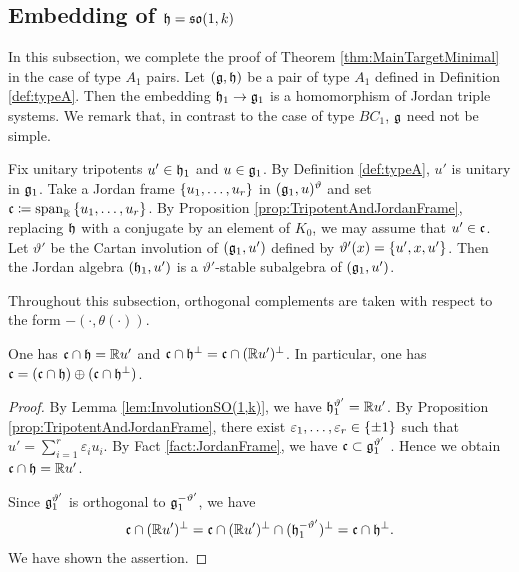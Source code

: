 \subsection{Embedding of \texorpdfstring{$\mathfrak{h} = \mathfrak{so}(1, k)$}{h=so(1,k)}}

In this subsection, we complete the proof of Theorem \ref{thm:MainTargetMinimal} in the case of type $A_1$ pairs.
Let $(\mathfrak{g}, \mathfrak{h})$ be a pair of type $A_1$ defined in Definition \ref{def:typeA}.
Then the embedding $\mathfrak{h}_1 \rightarrow \mathfrak{g}_1$ is a homomorphism of Jordan triple systems.
We remark that, in contrast to the case of type $BC_1$, $\mathfrak{g}$ need not be simple.

Fix unitary tripotents $u' \in \mathfrak{h}_1$ and $u \in \mathfrak{g}_1$.
By Definition \ref{def:typeA}, $u'$ is unitary in $\mathfrak{g}_1$.
Take a Jordan frame $\left\{u_1, \ldots, u_r \right\}$ in $(\mathfrak{g}_1, u)^\vartheta$ and set $\mathfrak{c}\coloneq \mathrm{span}_{\mathbb{R}}\left\{u_1, \ldots, u_r\right\}$.
By Proposition \ref{prop:TripotentAndJordanFrame}, replacing $\mathfrak{h}$ with a conjugate by an element of $K_0$, we may assume that $u' \in \mathfrak{c}$.
Let $\vartheta'$ be the Cartan involution of $(\mathfrak{g}_1, u')$ defined by $\vartheta'(x) = \{u', x, u'\}$.
Then the Jordan algebra $(\mathfrak{h}_1, u')$ is a $\vartheta'$-stable subalgebra of $(\mathfrak{g}_1, u')$.

Throughout this subsection, orthogonal complements are taken with respect to the form $-(\cdot,\theta(\cdot))$.

\begin{lemma} \label{lem:HperpInC}
	One has $\mathfrak{c}\cap \mathfrak{h} = \mathbb{R} u'$ and $\mathfrak{c} \cap \mathfrak{h}^\perp = \mathfrak{c} \cap (\mathbb{R} u')^\perp$.
	In particular, one has $\mathfrak{c} = (\mathfrak{c}\cap \mathfrak{h}) \oplus (\mathfrak{c} \cap \mathfrak{h}^\perp)$.
\end{lemma}

\begin{proof}
	By Lemma \ref{lem:InvolutionSO(1,k)}, we have $\mathfrak{h}_1^{\vartheta'} = \mathbb{R} u'$.
	By Proposition \ref{prop:TripotentAndJordanFrame}, there exist $\varepsilon_1, \ldots, \varepsilon_r \in \left\{\pm 1 \right\}$ such that $u' = \sum_{i=1}^r \varepsilon_i u_i$.
	By Fact \ref{fact:JordanFrame}, we have $\mathfrak{c} \subset \mathfrak{g}_1^{\vartheta'}$ .
	Hence we obtain $\mathfrak{c}\cap \mathfrak{h} = \mathbb{R} u'$.

	Since $\mathfrak{g}_1^{\vartheta'}$ is orthogonal to $\mathfrak{g}_1^{-\vartheta'}$, we have
	\begin{align*}
		\mathfrak{c} \cap (\mathbb{R} u')^\perp = \mathfrak{c} \cap (\mathbb{R} u')^\perp \cap (\mathfrak{h}_1^{-\vartheta'})^\perp = \mathfrak{c} \cap \mathfrak{h}^\perp.
	\end{align*}
	We have shown the assertion.
\end{proof}

